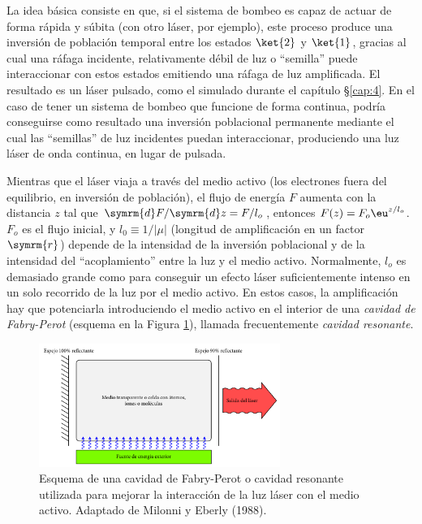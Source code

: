 La idea básica consiste en que, si el sistema de bombeo es capaz de actuar de forma rápida y súbita (con otro láser, por ejemplo), este proceso produce una inversión de población temporal entre los estados $\ket{2}$ y $\ket{1}$, gracias al cual una ráfaga incidente, relativamente débil de luz o \enquote{semilla} puede interaccionar con estos estados emitiendo una ráfaga de luz amplificada. El resultado es un láser pulsado, como el simulado durante el capítulo \S\ref{cap:4}. En el caso de tener un sistema de bombeo que funcione de forma continua, podría conseguirse como resultado una inversión poblacional permanente mediante el cual las \enquote{semillas} de luz incidentes puedan interaccionar, produciendo una luz láser de onda continua, en lugar de pulsada.

Mientras que el láser viaja a través del medio activo (los electrones fuera del equilibrio, en inversión de población), el flujo de energía $F$ aumenta con la distancia $z$ tal que $\symrm{d}F/\symrm{d}z = F/l_{o}$, entonces $F(z) = F_{o}\eu^{z/l_{o}}$. $F_{o}$ es el flujo inicial, y $l_{0} \equiv 1/|\mu|$ (longitud de amplificación en un factor $\symrm{r}$) depende de la intensidad de la inversión poblacional y de la intensidad del \enquote{acoplamiento} entre la luz y el medio activo. Normalmente, $l_{o}$ es demasiado grande como para conseguir un efecto láser suficientemente intenso en un solo recorrido de la luz por el medio activo. En estos casos, la amplificación hay que potenciarla introduciendo el medio activo en el interior de una \emph{cavidad de Fabry-Perot} (esquema en la Figura \ref{fig:1.4}), llamada frecuentemente \emph{cavidad resonante}.

\begin{figure}[htbp]
  \centering
  \includegraphics[width=0.7\textwidth]{Figuras/ch1_cavidad.pdf}
  \caption{Esquema de una cavidad de Fabry-Perot o cavidad resonante utilizada para mejorar la interacción de la luz láser con el medio activo. Adaptado de Milonni y Eberly (1988)\autocite{Milonni1988}.}
  \label{fig:1.4}
\end{figure}


